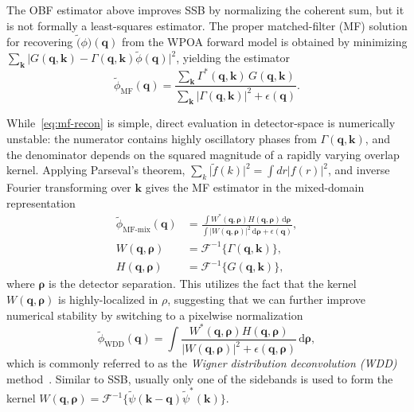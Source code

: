 \documentclass[pdflatex,sn-aps,iicol]{sn-jnl}%
\begin{document}
The OBF estimator above improves SSB by normalizing the coherent sum, but it is not formally a least-squares estimator.
The proper matched-filter (MF) solution for recovering $\tilde(\phi)(\boldsymbol{q})$ from the WPOA forward model is obtained by minimizing $\sum_{\boldsymbol{k}}\lvert G(\boldsymbol{q},\boldsymbol{k})-\Gamma(\boldsymbol{q},\boldsymbol{k})\tilde{\phi}(\boldsymbol{q}) \rvert^2$, yielding the estimator
\begin{equation}
  \tilde{\phi}_{\text{MF}}(\boldsymbol{q}) = 
  \frac{\sum_{\boldsymbol{k}} \Gamma^{*}(\boldsymbol{q},\boldsymbol{k})\,G(\boldsymbol{q},\boldsymbol{k})}{\sum_{\boldsymbol{k}}\lvert \Gamma(\boldsymbol{q},\boldsymbol{k}) \rvert^2 + \epsilon(\boldsymbol{q})}.
  \label{eq:mf-recon}
\end{equation}

While~\cref{eq:mf-recon} is simple, direct evaluation in detector-space is numerically unstable:
the numerator contains highly oscillatory phases from $\Gamma(\boldsymbol{q},\boldsymbol{k})$, and the denominator depends on the squared magnitude of a rapidly varying overlap kernel.
Applying Parseval's theorem, $\sum_k \lvert \tilde{f}(k)\rvert^2 = \int d r \lvert f(r)\rvert^2$, and inverse Fourier transforming over $\boldsymbol{k}$ gives the MF estimator in the mixed-domain representation
\begin{align}
\tilde{\phi}_{\text{MF-mix}}(\boldsymbol{q})
&=
\frac{\int W^{*}(\boldsymbol{q},\boldsymbol{\rho})H(\boldsymbol{q},\boldsymbol{\rho})\,\mathrm{d}\boldsymbol{\rho}}{\int \lvert W(\boldsymbol{q},\boldsymbol{\rho}) \rvert^2\,\mathrm{d}\boldsymbol{\rho}+\epsilon(\boldsymbol{q})},
\label{eq:mf-mixed-recon}
\\
W(\boldsymbol{q},\boldsymbol{\rho})
&=
\mathcal{F}^{-1}\{\Gamma(\boldsymbol{q},\boldsymbol{k})\},
\label{eq:wigner-w}
\\
H(\boldsymbol{q},\boldsymbol{\rho})
&=
\mathcal{F}^{-1}\{G(\boldsymbol{q},\boldsymbol{k})\},
\label{eq:wigner-h}
\end{align}
where $\boldsymbol{\rho}$ is the detector separation.
This utilizes the fact that the kernel $W(\boldsymbol{q},\boldsymbol{\rho})$ is highly-localized in $\rho$, suggesting that we can further improve numerical stability by switching to a pixelwise normalization
\begin{equation}
\tilde{\phi}_{\text{WDD}}(\boldsymbol{q})=
\int \frac{ W^{*}(\boldsymbol{q},\boldsymbol{\rho})H(\boldsymbol{q},\boldsymbol{\rho})}{\lvert W(\boldsymbol{q},\boldsymbol{\rho}) \rvert^2+\epsilon(\boldsymbol{q},\boldsymbol{\rho})}\,\mathrm{d}\boldsymbol{\rho},
\label{eq:wdd-recon}
\end{equation}
which is commonly referred to as the \emph{Wigner distribution deconvolution (WDD)} method~\cite{Rodenburg_1992,Li_2014,Yang_2017}.
Similar to SSB, usually only one of the sidebands is used to form the kernel $W(\boldsymbol{q},\boldsymbol{\rho}) = \mathcal{F}^{-1}\{\tilde{\psi}(\boldsymbol{k-q})\tilde{\psi}^{*}(\boldsymbol{k})\}$.
\end{document}
